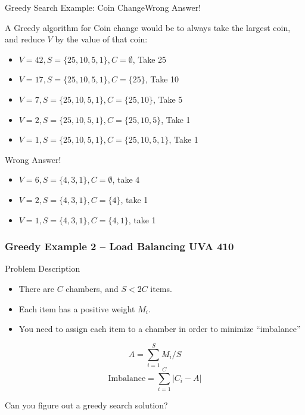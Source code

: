 \begin{frame}{Greedy Search Example: Coin Change}{Wrong Answer!}
  \begin{block}{}
    A Greedy algorithm for Coin change would be to always take the largest coin, and reduce $V$ by the value of that coin:
    \begin{itemize}
      \item $V = 42, S = \{ 25, 10, 5, 1\}, C = \emptyset$, Take 25
      \item $V = 17, S = \{ 25, 10, 5, 1\}, C = \{25\}$, Take 10
      \item $V = 7, S = \{ 25, 10, 5, 1\}, C = \{25, 10\}$, Take 5
      \item $V = 2, S = \{ 25, 10, 5, 1\}, C = \{25, 10, 5\}$, Take 1
      \item $V = 1, S = \{ 25, 10, 5, 1\}, C = \{25, 10, 5, 1\}$, Take 1
    \end{itemize}
  \end{block}

  \begin{alertblock}{Wrong Answer!}
    \begin{itemize}
      \item $V = 6, S = \{4,3,1\}, C = \emptyset$, take 4
      \item $V = 2, S = \{4,3,1\}, C = \{4\}$, take 1
      \item $V = 1, S = \{4,3,1\}, C = \{4,1\}$, take 1
    \end{itemize}
  \end{alertblock}
\end{frame}

\begin{frame}
  \frametitle{Greedy Example 2 -- Load Balancing UVA 410}

  \begin{block}{Problem Description}

    \begin{itemize}
    \item There are $C$ chambers, and $S < 2C$ items.
    \item Each item has a positive weight $M_i$.
    \item You need to assign each item to a chamber in order to minimize ``imbalance''
    \end{itemize}

    \begin{equation*}
      A = \sum^S_{i=1}M_i/S
    \end{equation*}
    \begin{equation*}
      \text{Imbalance} = \sum^C_{i=1} |C_i - A|
    \end{equation*}
  \end{block}


  Can you figure out a greedy search solution?
\end{frame}


